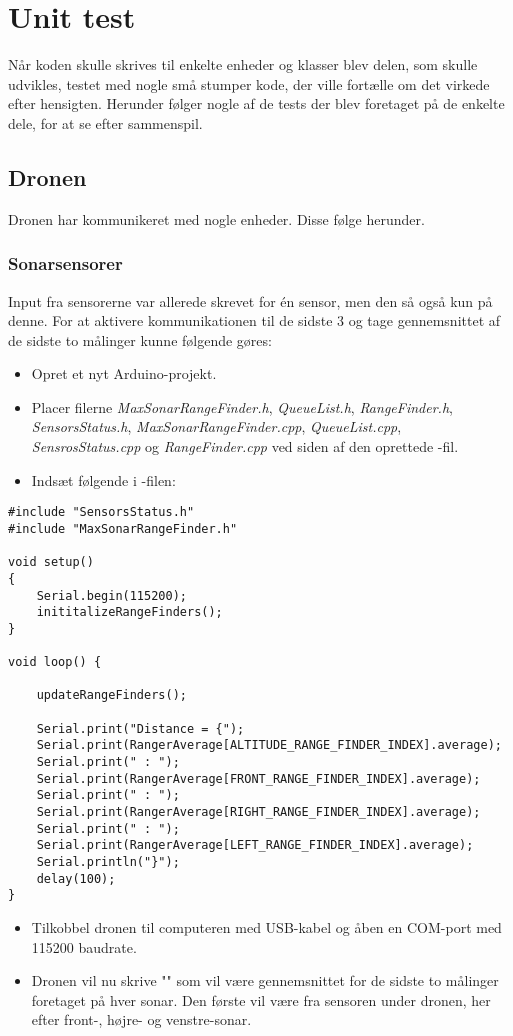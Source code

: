 \documentclass[Main]{subfiles}
\begin{document}
\chapter{Unit test}
Når koden skulle skrives til enkelte enheder og klasser blev delen, som skulle udvikles, testet med nogle små stumper kode, der ville fortælle om det virkede efter hensigten.
Herunder følger nogle af de tests der blev foretaget på de enkelte dele, for at se efter sammenspil.

\section{Dronen}
Dronen har kommunikeret med nogle enheder.
Disse følge herunder.

\subsection{Sonarsensorer}
Input fra sensorerne var allerede skrevet for én sensor, men den så også kun på denne.
For at aktivere kommunikationen til de sidste 3 og tage gennemsnittet af de sidste to målinger kunne følgende gøres:

\begin{itemize}
\item Opret et nyt Arduino-projekt.
\item Placer filerne \textit{MaxSonarRangeFinder.h}, \textit{QueueList.h}, \textit{RangeFinder.h}, \textit{SensorsStatus.h}, \textit{MaxSonarRangeFinder.cpp}, \textit{QueueList.cpp}, \textit{SensrosStatus.cpp} og \textit{RangeFinder.cpp} ved siden af den oprettede -fil.
\item Indsæt følgende i -filen:
\end{itemize}


\begin{lstlisting}[caption=title, style=Code-C, label=lst:ref]
#include "SensorsStatus.h"
#include "MaxSonarRangeFinder.h"

void setup() 
{
	Serial.begin(115200);
	inititalizeRangeFinders();
}

void loop() {
  
	updateRangeFinders();
  
	Serial.print("Distance = {");
	Serial.print(RangerAverage[ALTITUDE_RANGE_FINDER_INDEX].average);
	Serial.print(" : ");
	Serial.print(RangerAverage[FRONT_RANGE_FINDER_INDEX].average);
	Serial.print(" : ");
	Serial.print(RangerAverage[RIGHT_RANGE_FINDER_INDEX].average);
	Serial.print(" : ");
	Serial.print(RangerAverage[LEFT_RANGE_FINDER_INDEX].average);
	Serial.println("}");
	delay(100);
}
\end{lstlisting}
\begin{itemize}
\item Tilkobbel dronen til computeren med USB-kabel og åben en COM-port med 115200 baudrate.
\item Dronen vil nu skrive ""\xspace som vil være gennemsnittet for de sidste to målinger foretaget på hver sonar.
Den første vil være fra sensoren under dronen, her efter front-, højre- og venstre-sonar.
\end{itemize}
\end{document}

